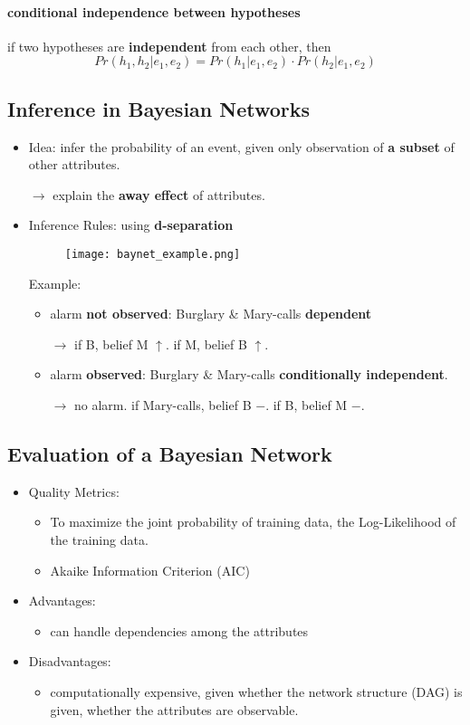 \paragraph{conditional independence between hypotheses}

 if two hypotheses are \textbf{independent} from each other, then
	$$Pr(h_1, h_2 | e_1, e_2) = Pr(h_1|e_1,e_2) \cdot Pr(h_2|e_1,e_2)$$

\subsection{Inference in Bayesian Networks}
\begin{itemize}
	\item Idea: infer the probability of an event, given only observation of \textbf{a subset} of other attributes. 
	
	$\rightarrow$ explain the \textbf{away effect} of attributes.
	\item Inference Rules: using \textbf{d-separation}
	\begin{figure}[H]
		\centering
		\texttt{[image: baynet\_example.png]}
	\end{figure}
	Example:
	\begin{itemize}
		\item alarm \textbf{not observed}: Burglary \& Mary-calls \textbf{dependent}
				
		$\rightarrow$ if B, belief M $\uparrow$. if M, belief B $\uparrow$.
		
		\item alarm \textbf{observed}: Burglary \& Mary-calls \textbf{conditionally independent}.
				
		$\rightarrow$ no alarm. if Mary-calls, belief B $-$. if B, belief M $-$. 
	\end{itemize}
\end{itemize}

\subsection{Evaluation of a Bayesian Network}
\begin{itemize}
	\item Quality Metrics:
	\begin{itemize}
		\item To maximize the joint probability of training data, the Log-Likelihood of the training data.
		\item Akaike Information Criterion (AIC)
	\end{itemize}
	\item Advantages:
	\begin{itemize}
		\item can handle dependencies among the attributes
	\end{itemize}
	\item Disadvantages:
	\begin{itemize}
		\item computationally expensive, given whether the network structure (DAG) is given, whether the attributes are observable.
	\end{itemize}
\end{itemize}
